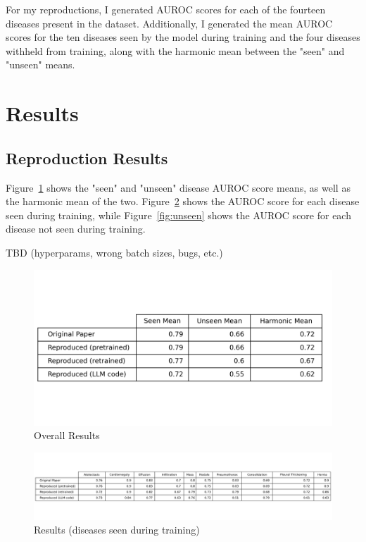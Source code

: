 \documentclass[letterpaper]{article} %
\begin{document}
For my reproductions, I generated AUROC scores for each of the fourteen diseases present in the dataset. Additionally, I generated the mean AUROC scores for the ten diseases seen by the model during training and the four diseases withheld from training, along with the harmonic mean between the "seen" and "unseen" means.

\section{Results}

\subsection{Reproduction Results}

Figure~\ref{fig:means} shows the "seen" and "unseen" disease AUROC score means, as well as the harmonic mean of the two. Figure~\ref{fig:seen} shows the AUROC score for each disease seen during training, while Figure~\ref{fig:unseen} shows the AUROC score for each disease not seen during training.

TBD (hyperparams, wrong batch sizes, bugs, etc.)

\begin{figure}[h!]
\centering
\includegraphics[width=0.9\columnwidth]{means.png}
\caption{Overall Results}
\label{fig:means}
\end{figure}

\begin{figure}[h!]
\centering
\includegraphics[width=0.9\columnwidth]{seen.png}
\caption{Results (diseases seen during training)}
\label{fig:seen}
\end{figure}
\end{document}
